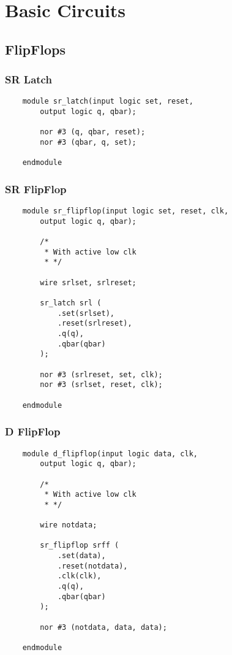 \documentclass[../main]{subfiles}
\begin{document}
\section{Basic Circuits}

\subsection {FlipFlops}

\subsubsection {SR Latch}

\begin{verbatim}
    module sr_latch(input logic set, reset,
        output logic q, qbar);

        nor #3 (q, qbar, reset);
        nor #3 (qbar, q, set);

    endmodule
\end{verbatim}

\subsubsection {SR FlipFlop}

\begin{verbatim}
    module sr_flipflop(input logic set, reset, clk,
        output logic q, qbar);

        /*
         * With active low clk
         * */

        wire srlset, srlreset;

        sr_latch srl (
            .set(srlset),
            .reset(srlreset),
            .q(q),
            .qbar(qbar)
        );

        nor #3 (srlreset, set, clk);
        nor #3 (srlset, reset, clk);

    endmodule
\end{verbatim}

\subsubsection {D FlipFlop}

\begin{verbatim}
    module d_flipflop(input logic data, clk,
        output logic q, qbar);

        /*
         * With active low clk
         * */

        wire notdata;

        sr_flipflop srff (
            .set(data),
            .reset(notdata),
            .clk(clk),
            .q(q),
            .qbar(qbar)
        );

        nor #3 (notdata, data, data);

    endmodule
\end{verbatim}
\end{document}
